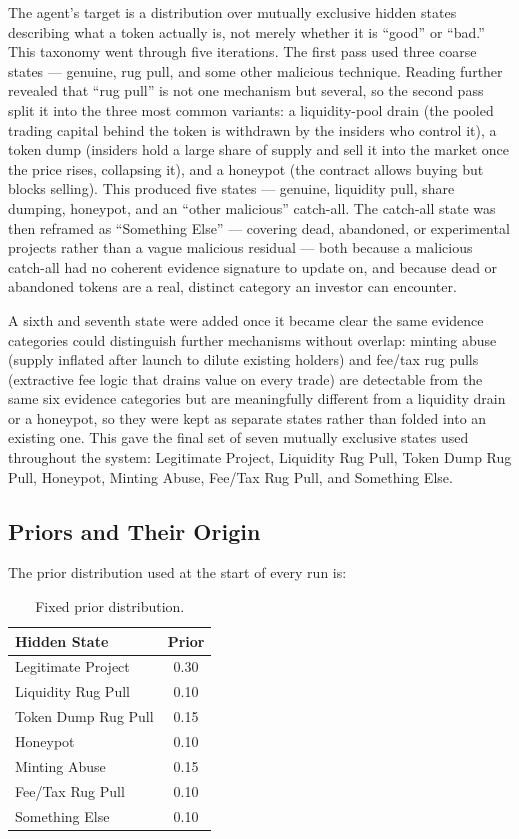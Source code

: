 \documentclass[11pt]{article}
\begin{document}
The agent's target is a distribution over mutually exclusive hidden states describing what a token actually is, not merely whether it is ``good'' or ``bad.'' This taxonomy went through five iterations. The first pass used three coarse states --- genuine, rug pull, and some other malicious technique. Reading further revealed that ``rug pull'' is not one mechanism but several, so the second pass split it into the three most common variants: a liquidity-pool drain (the pooled trading capital behind the token is withdrawn by the insiders who control it), a token dump (insiders hold a large share of supply and sell it into the market once the price rises, collapsing it), and a honeypot (the contract allows buying but blocks selling). This produced five states --- genuine, liquidity pull, share dumping, honeypot, and an ``other malicious'' catch-all. The catch-all state was then reframed as ``Something Else'' --- covering dead, abandoned, or experimental projects rather than a vague malicious residual --- both because a malicious catch-all had no coherent evidence signature to update on, and because dead or abandoned tokens are a real, distinct category an investor can encounter.

A sixth and seventh state were added once it became clear the same evidence categories could distinguish further mechanisms without overlap: minting abuse (supply inflated after launch to dilute existing holders) and fee/tax rug pulls (extractive fee logic that drains value on every trade) are detectable from the same six evidence categories but are meaningfully different from a liquidity drain or a honeypot, so they were kept as separate states rather than folded into an existing one. This gave the final set of seven mutually exclusive states used throughout the system: Legitimate Project, Liquidity Rug Pull, Token Dump Rug Pull, Honeypot, Minting Abuse, Fee/Tax Rug Pull, and Something Else.

\subsection{Priors and Their Origin}

The prior distribution used at the start of every run is:

\begin{table}[h]
\centering
\begin{tabular}{lc}
\toprule
\textbf{Hidden State} & \textbf{Prior}\\
\midrule
Legitimate Project & 0.30\\
Liquidity Rug Pull & 0.10\\
Token Dump Rug Pull & 0.15\\
Honeypot & 0.10\\
Minting Abuse & 0.15\\
Fee/Tax Rug Pull & 0.10\\
Something Else & 0.10\\
\bottomrule
\end{tabular}
\caption{Fixed prior distribution.}
\end{table}
\end{document}
